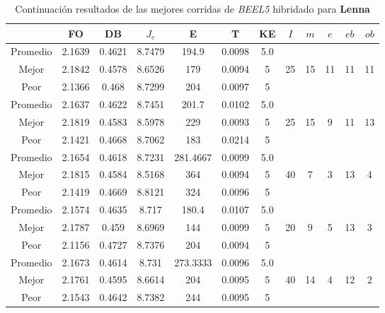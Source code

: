 \begin{table}[h!]
    \footnotesize
    \begin{center}
        \begin{tabular}{|c|c|c|c|c|c|c|c|c|c|c|c|}
        \hline
             & {\bf FO} & {\bf DB} & $J_e$ & {\bf E} & {\bf T} & {\bf KE} & $I$ & $m$ & $e$ & $eb$ & $ob$ \\
        \hline
        \hline
            Promedio  & 2.1639 & 0.4621 & 8.7479 & 194.9 & 0.0098 & 5.0 &  &  &  &  & \\
            \cline{1-7}
            Mejor & 2.1842 & 0.4578  & 8.6526 & 179 & 0.0094 & 5 & 25 & 15 & 11 & 11 & 11\\
            \cline{1-7}
            Peor & 2.1366 & 0.468  & 8.7299 & 204 & 0.0097 & 5 &  &  &  &  & \\
        \hline
        \hline
            Promedio  & 2.1637 & 0.4622 & 8.7451 & 201.7 & 0.0102 & 5.0 &  &  &  &  & \\
            \cline{1-7}
            Mejor & 2.1819 & 0.4583  & 8.5978 & 229 & 0.0093 & 5 & 25 & 15 & 9 & 11 & 13\\
            \cline{1-7}
            Peor & 2.1421 & 0.4668  & 8.7062 & 183 & 0.0214 & 5 &  &  &  &  & \\
        \hline
        \hline
            Promedio  & 2.1654 & 0.4618 & 8.7231 & 281.4667 & 0.0099 & 5.0 &  &  &  &  & \\
            \cline{1-7}
            Mejor & 2.1815 & 0.4584  & 8.5168 & 364 & 0.0094 & 5 & 40 & 7 & 3 & 13 & 4\\
            \cline{1-7}
            Peor & 2.1419 & 0.4669  & 8.8121 & 324 & 0.0096 & 5 &  &  &  &  & \\
        \hline
        \hline
            Promedio  & 2.1574 & 0.4635 & 8.717 & 180.4 & 0.0107 & 5.0 &  &  &  &  & \\
            \cline{1-7}
            Mejor & 2.1787 & 0.459  & 8.6969 & 144 & 0.0099 & 5 & 20 & 9 & 5 & 13 & 3\\
            \cline{1-7}
            Peor & 2.1156 & 0.4727  & 8.7376 & 204 & 0.0094 & 5 &  &  &  &  & \\
        \hline
        \hline
            Promedio  & 2.1673 & 0.4614 & 8.731 & 273.3333 & 0.0096 & 5.0 &  &  &  &  & \\
            \cline{1-7}
            Mejor & 2.1761 & 0.4595  & 8.6614 & 204 & 0.0095 & 5 & 40 & 14 & 4 & 12 & 2\\
            \cline{1-7}
            Peor & 2.1543 & 0.4642  & 8.7382 & 244 & 0.0095 & 5 &  &  &  &  & \\
        \hline
        \end{tabular}
        \caption{Continuaci\'on resultados de las mejores corridas de \emph{BEEL5} hibridado para {\bf Lenna}}
        \label{tb:ctableBEEL5}
    \end{center}
\end{table}
